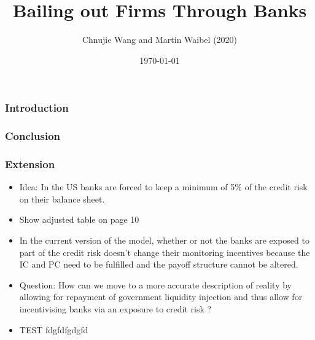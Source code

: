 \documentclass{beamer}
\begin{document}
	
\title{Bailing out Firms Through Banks}
\author{Chnujie Wang and Martin Waibel (2020)}
\date{\today}

 \renewcommand*\inserttotalframenumber{14	}

\begin{frame}
\maketitle
\end{frame}


\begin{frame}
\frametitle{Introduction}
\end{frame}

\begin{frame}
\frametitle{Conclusion}
\end{frame}

\begin{frame}
\frametitle{Extension}
\begin{itemize}
	\item Idea: In the US banks are forced to keep a minimum of 5\% of the credit risk on their balance sheet. 

	\item Show adjusted table on page 10 

	\item In the current version of the model, whether or not the banks are exposed to part of the credit risk doesn't change their monitoring incentives because the IC and PC need to be fulfilled and the payoff structure cannot be altered. 

	\item Question: How can we move to a more accurate description of reality by allowing for repayment of government liquidity injection and thus allow for incentivising banks via an exposure to credit risk ?


	\item TEST fdgfdfgdgfd
\end{itemize}

\end{frame}
\end{document}
